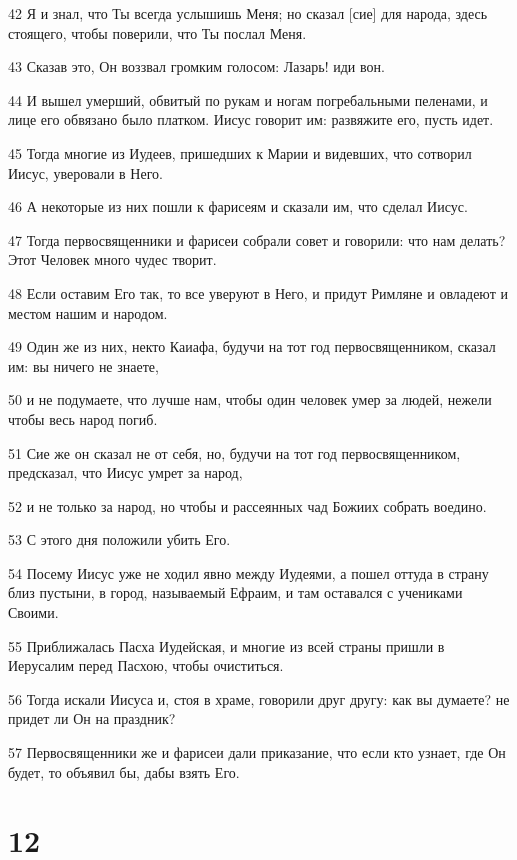 \par 42 Я и знал, что Ты всегда услышишь Меня; но сказал [сие] для народа, здесь стоящего, чтобы поверили, что Ты послал Меня.
\par 43 Сказав это, Он воззвал громким голосом: Лазарь! иди вон.
\par 44 И вышел умерший, обвитый по рукам и ногам погребальными пеленами, и лице его обвязано было платком. Иисус говорит им: развяжите его, пусть идет.
\par 45 Тогда многие из Иудеев, пришедших к Марии и видевших, что сотворил Иисус, уверовали в Него.
\par 46 А некоторые из них пошли к фарисеям и сказали им, что сделал Иисус.
\par 47 Тогда первосвященники и фарисеи собрали совет и говорили: что нам делать? Этот Человек много чудес творит.
\par 48 Если оставим Его так, то все уверуют в Него, и придут Римляне и овладеют и местом нашим и народом.
\par 49 Один же из них, некто Каиафа, будучи на тот год первосвященником, сказал им: вы ничего не знаете,
\par 50 и не подумаете, что лучше нам, чтобы один человек умер за людей, нежели чтобы весь народ погиб.
\par 51 Сие же он сказал не от себя, но, будучи на тот год первосвященником, предсказал, что Иисус умрет за народ,
\par 52 и не только за народ, но чтобы и рассеянных чад Божиих собрать воедино.
\par 53 С этого дня положили убить Его.
\par 54 Посему Иисус уже не ходил явно между Иудеями, а пошел оттуда в страну близ пустыни, в город, называемый Ефраим, и там оставался с учениками Своими.
\par 55 Приближалась Пасха Иудейская, и многие из всей страны пришли в Иерусалим перед Пасхою, чтобы очиститься.
\par 56 Тогда искали Иисуса и, стоя в храме, говорили друг другу: как вы думаете? не придет ли Он на праздник?
\par 57 Первосвященники же и фарисеи дали приказание, что если кто узнает, где Он будет, то объявил бы, дабы взять Его.

\chapter{12}

